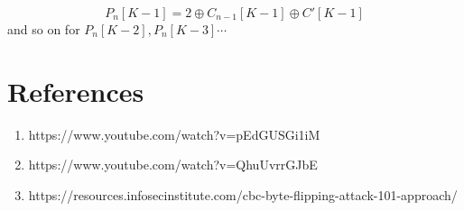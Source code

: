 \documentclass[12pt]{article}
\begin{document}
$$P_n[K-1] = 2 \oplus C_{n-1}[K-1] \oplus C'[K-1]$$ and so on for $P_n[K-2], P_n[K-3] \cdots$


\section{References}
\begin{enumerate}
\item https://www.youtube.com/watch?v=pEdGUSGi1iM
\item https://www.youtube.com/watch?v=QhuUvrrGJbE
\item https://resources.infosecinstitute.com/cbc-byte-flipping-attack-101-approach/

\end{enumerate}
\end{document}

